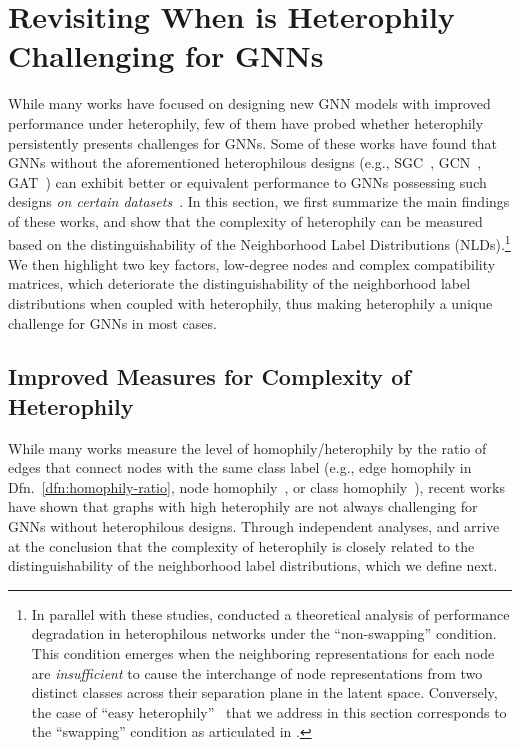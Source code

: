 \section{Revisiting When is Heterophily Challenging for GNNs}
\label{sec:complexity}

While many works have focused on designing new GNN models with improved performance under heterophily, few of them have probed whether heterophily persistently presents challenges for GNNs. Some of these works have found that GNNs without the aforementioned heterophilous designs (e.g., SGC~\cite{wu2019simplifying}, GCN~\cite{kipf2016semi}, GAT~\cite{velickovic2018graph}) can exhibit better or equivalent performance to GNNs possessing such designs \emph{on certain datasets}~\cite{ma2021homophily,luan2022revisiting}.
In this section, we first summarize the main findings of these works, 
and show that the complexity of heterophily can be measured based on the distinguishability of the Neighborhood Label Distributions (NLDs).\footnote{In parallel with these studies, \citet{yan2022two} conducted a theoretical analysis of performance degradation in heterophilous networks under the ``non-swapping'' condition. This condition emerges when the neighboring representations for each node are \emph{insufficient} to cause the interchange of node representations from two distinct classes across their separation plane in the latent space. Conversely, the case of ``easy heterophily''~\cite{ma2021homophily,luan2022revisiting} that we address in this section corresponds to the ``swapping'' condition as articulated in \cite{yan2022two}.}
We then highlight two key factors, low-degree nodes and complex compatibility matrices, which deteriorate the distinguishability of the neighborhood label distributions when coupled with heterophily, thus making heterophily a unique challenge for GNNs in most cases. 


\subsection{Improved Measures for Complexity of Heterophily}
\label{sec:complexity-measurements}

While many works measure the level of homophily/heterophily by the ratio of edges that connect nodes with the same class label (e.g., edge homophily in Dfn.~\ref{dfn:homophily-ratio}, node homophily~\cite{Pei2020Geom-GCN}, or class homophily~\cite{lim2021large}), recent works have shown that graphs with high heterophily are not always challenging for GNNs without heterophilous designs. 
Through independent analyses, \citet{ma2021homophily} and \citet{luan2022revisiting} arrive at the conclusion that the complexity of heterophily is closely related to the distinguishability of the neighborhood label distributions, which we define next. 

